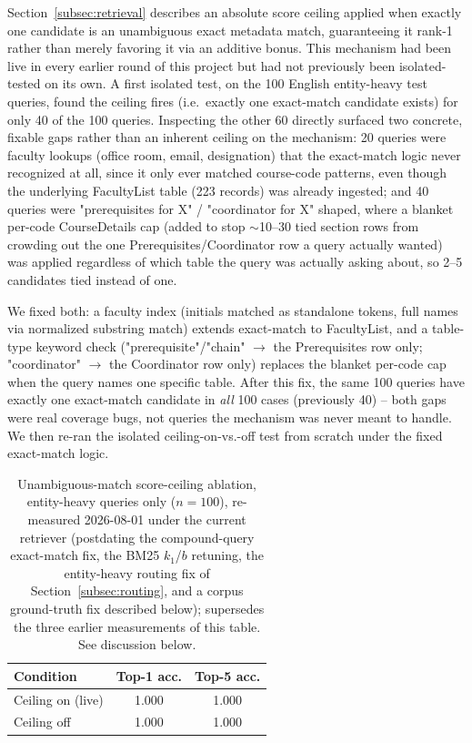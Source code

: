 \documentclass[a4paper,twoside]{article}
\begin{document}
Section~\ref{subsec:retrieval} describes an absolute score ceiling applied when exactly one candidate is an unambiguous exact metadata match, guaranteeing it rank-1 rather than merely favoring it via an additive bonus. This mechanism had been live in every earlier round of this project but had not previously been isolated-tested on its own. A first isolated test, on the 100 English entity-heavy test queries, found the ceiling fires (i.e.\ exactly one exact-match candidate exists) for only 40 of the 100 queries. Inspecting the other 60 directly surfaced two concrete, fixable gaps rather than an inherent ceiling on the mechanism: 20 queries were faculty lookups (office room, email, designation) that the exact-match logic never recognized at all, since it only ever matched course-code patterns, even though the underlying FacultyList table (223 records) was already ingested; and 40 queries were "prerequisites for X" / "coordinator for X" shaped, where a blanket per-code CourseDetails cap (added to stop $\sim$10--30 tied section rows from crowding out the one Prerequisites/Coordinator row a query actually wanted) was applied regardless of which table the query was actually asking about, so 2--5 candidates tied instead of one.

We fixed both: a faculty index (initials matched as standalone tokens, full names via normalized substring match) extends exact-match to FacultyList, and a table-type keyword check ("prerequisite"/"chain" $\to$ the Prerequisites row only; "coordinator" $\to$ the Coordinator row only) replaces the blanket per-code cap when the query names one specific table. After this fix, the same 100 queries have exactly one exact-match candidate in \emph{all} 100 cases (previously 40) -- both gaps were real coverage bugs, not queries the mechanism was never meant to handle. We then re-ran the isolated ceiling-on-vs.-off test from scratch under the fixed exact-match logic.

\begin{table}[t]
\caption{Unambiguous-match score-ceiling ablation, entity-heavy queries only ($n=100$), re-measured 2026-08-01 under the current retriever (postdating the compound-query exact-match fix, the BM25 $k_1$/$b$ retuning, the entity-heavy routing fix of Section~\ref{subsec:routing}, and a corpus ground-truth fix described below); supersedes the three earlier measurements of this table. See discussion below.}\label{tab:unambiguous} \centering
\begin{tabular}{|l|c|c|}
\hline
Condition & Top-1 acc. & Top-5 acc. \\
\hline
Ceiling on (live) & 1.000 & 1.000 \\
Ceiling off & 1.000 & 1.000 \\
\hline
\end{tabular}
\end{table}
\end{document}
